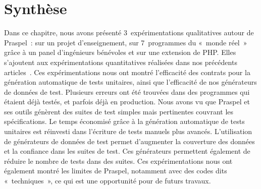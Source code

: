 \section{Synthèse}
\label{section:experimentation:other}

Dans ce chapitre, nous avons présenté 3~expérimentations qualitatives autour de
Praspel~: sur un projet d'enseignement, sur 7~programmes du «~monde réel~» grâce
à un panel d'ingénieurs bénévoles et sur une extension de PHP. Elles s'ajoutent
aux expérimentations quantitatives réalisées dans nos précédents
articles~. Ces
expérimentations nous ont montré l'efficacité des contrats pour la génération
automatique de tests unitaires, ainsi que l'efficacité de nos générateurs de
données de test. Plusieurs erreurs ont été trouvées dans des programmes qui
étaient déjà testés, et parfois déjà en production. Nous avons vu que Praspel et
ses outils génèrent des suites de test simples mais pertinentes couvrant les
spécifications. Le temps économisé grâce à la génération automatique de tests
unitaires est réinvesti dans l'écriture de tests manuels plus avancés.
L'utilisation de générateurs de données de test permet d'augmenter la couverture
des données et la confiance dans les suites de test. Ces générateurs permettent
également de réduire le nombre de tests dans des suites. Ces expérimentations
nous ont également montré les limites de Praspel, notamment avec des codes dits
«~techniques~»,  ce qui est une opportunité pour de futurs travaux.
